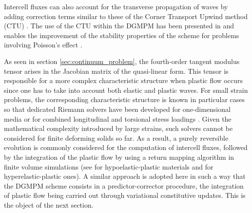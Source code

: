 \begin{remark}
  Intercell fluxes can also account for the transverse propagation of waves by adding correction terms similar to these of the Corner Transport Upwind method (CTU) \cite{Colella_CTU}.
  The use of the CTU within the DGMPM has been presented in \cite{DGMPM} and enables the improvement of the stability properties of the scheme for problems involving Poisson's effect \cite{Thesis}.
\end{remark}


As seen in section \ref{sec:continuum_problem}, the fourth-order tangent modulus tensor arises in the Jacobian matrix of the quasi-linear form.
This tensor is responsible for a more complex characteristic structure when plastic flow occurs since one has to take into account both elastic and plastic waves.
For small strain problems, the corresponding characteristic structure is known in particular cases so that dedicated Riemann solvers have been developed for one-dimensional media \cite{Thomas_EP} or for combined longitudinal and torsional stress loadings \cite{Lin_et_Ballman}.
Given the mathematical complexity introduced by large strains, such solvers cannot be considered for finite deforming solids so far.
As a result, a purely reversible evolution is commonly considered for the computation of intercell fluxes, followed by the integration of the plastic flow by using a return mapping algorithm in finite volume simulations (see \cite{FRRSE,Maire_elastoplast} for hypoelastic-plastic materials and \cite{Lee_FVM} for hyperelastic-plastic ones).
A similar approach is adopted here in such a way that the DGMPM scheme consists in a predictor-corrector procedure, the integration of plastic flow being carried out through variational constitutive updates.
This is the object of the next section.


